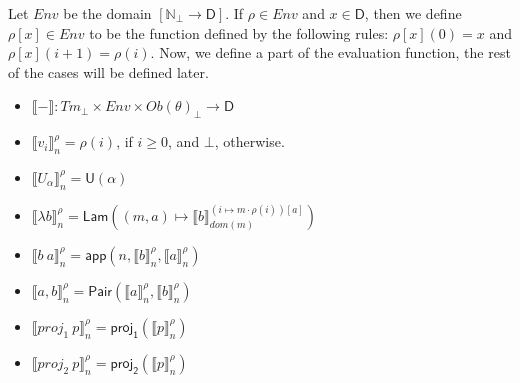 \documentclass{amsart}
\theoremstyle{definition}
\theoremstyle{remark}
\newcommand{\D}{\mathsf{D}}
\newcommand{\nats}{\mathbb{N}}
\numberwithin{table}{section}
\begin{document}
Let $Env$ be the domain $[\nats_\bot \to \D]$.
If $\rho \in Env$ and $x \in \D$, then we define $\rho[x] \in Env$ to be the function defined by the following rules: $\rho[x](0) = x$ and $\rho[x](i+1) = \rho(i)$.
Now, we define a part of the evaluation function, the rest of the cases will be defined later.
\begin{itemize}
\item[] $\llbracket - \rrbracket : Tm_\bot \times Env \times Ob(\theta)_\bot \to \D$
\item[] $\llbracket v_i \rrbracket^\rho_n = \rho(i)$, if $i \geq 0$, and $\bot$, otherwise.
\item[] $\llbracket U_\alpha \rrbracket^\rho_n = \mathsf{U}(\alpha)$
\item[] $\llbracket \lambda b \rrbracket^\rho_n = \mathsf{Lam}((m, a) \mapsto \llbracket b \rrbracket^{(i \mapsto m \cdot \rho(i))[a]}_{dom(m)})$
\item[] $\llbracket b\ a \rrbracket^\rho_n = \mathsf{app}(n, \llbracket b \rrbracket^\rho_n, \llbracket a \rrbracket^\rho_n)$
\item[] $\llbracket a, b \rrbracket^\rho_n = \mathsf{Pair}(\llbracket a \rrbracket^\rho_n, \llbracket b \rrbracket^\rho_n)$
\item[] $\llbracket proj_1\ p \rrbracket^\rho_n = \mathsf{proj_1}(\llbracket p \rrbracket^\rho_n)$
\item[] $\llbracket proj_2\ p \rrbracket^\rho_n = \mathsf{proj_2}(\llbracket p \rrbracket^\rho_n)$
\end{itemize}
\end{document}
